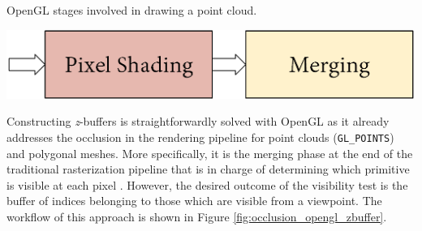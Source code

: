 \begin{marginfigure}[.cm]
    \caption{OpenGL stages involved in drawing a point cloud.}
    \label{fig:occlusion_opengl_zbuffer_core}
    \includegraphics[width=\linewidth]{figs/multi_thermal_projection/occlusion_opengl_core.png}
\end{marginfigure}
Constructing \textit{z}-buffers is straightforwardly solved with OpenGL as it already addresses the occlusion in the rendering pipeline for point clouds (\verb|GL_POINTS|) and polygonal meshes. More specifically, it is the merging phase at the end of the traditional rasterization pipeline that is in charge of determining which primitive is visible at each pixel \cite{akenine-moller_real-time_2018}. However, the desired outcome of the visibility test is the buffer of indices belonging to those which are visible from a viewpoint. The workflow of this approach is shown in Figure \ref{fig:occlusion_opengl_zbuffer}.


